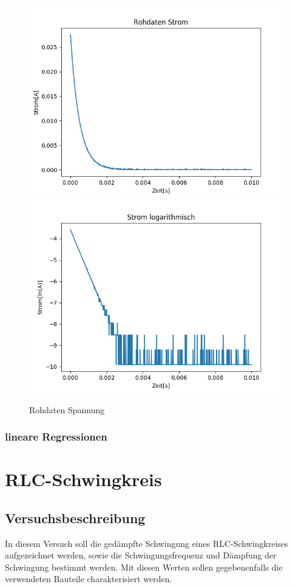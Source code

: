 \documentclass[12pt,a4paper]{article}
\begin{document}
\begin{figure}[H]
\begin{center}
\includegraphics[width=0.75\linewidth]{Bilder/Kondensator_I}
\includegraphics[width=0.75\linewidth]{Bilder/Kondensator_logI}
\caption[Rohdaten logarith. A]{Rohdaten Spannung}
\label{fig:RohU}
\end{center}
\end{figure}

\subsubsection{lineare Regressionen}

\section{RLC-Schwingkreis}
\subsection{Versuchsbeschreibung}

In diesem Versuch soll die gedämpfte Schwingung eines RLC-Schwingkreises aufgezeichnet werden, sowie die Schwingungsfrequenz und Dämpfung der Schwingung bestimmt werden.
Mit diesen Werten sollen gegebenenfalls die verwendeten Bauteile charakterisiert werden.
\end{document}
